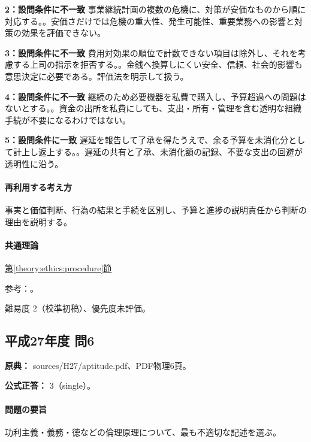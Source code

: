 \noindent\textbf{2：設問条件に不一致} 事業継続計画の複数の危機に、対策が安価なものから順に対応する。。安価さだけでは危機の重大性、発生可能性、重要業務への影響と対策の効果を評価できない。\par

\noindent\textbf{3：設問条件に不一致} 費用対効果の順位で計数できない項目は除外し、それを考慮する上司の指示を拒否する。。金銭へ換算しにくい安全、信頼、社会的影響も意思決定に必要である。評価法を明示して扱う。\par

\noindent\textbf{4：設問条件に不一致} 継続のため必要機器を私費で購入し、予算超過への問題はないとする。。資金の出所を私費にしても、支出・所有・管理を含む透明な組織手続が不要になるわけではない。\par

\noindent\textbf{5：設問条件に一致} 遅延を報告して了承を得たうえで、余る予算を未消化分として計上し返上する。。遅延の共有と了承、未消化額の記録、不要な支出の回避が透明性に沿う。\par

\paragraph{再利用する考え方} 事実と価値判断、行為の結果と手続を区別し、予算と進捗の説明責任から判断の理由を説明する。

\paragraph{共通理論} \hyperref[theory:ethics:procedure]{第\ref*{theory:ethics:procedure}節}

\par 参考：\cite{ipej_ethics2023}。

\par 難易度 2（校準初稿）、優先度未評価。

\subsection{平成27年度 問6}
\label{q:h27-reg-apt-06}

\noindent\textbf{原典：} sources/H27/aptitude.pdf、PDF物理6頁。

\textbf{公式正答：} 3（single）。

\paragraph{問題の要旨} 功利主義・義務・徳などの倫理原理について、最も不適切な記述を選ぶ。


